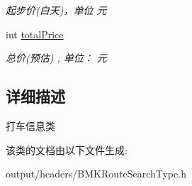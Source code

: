 \begin{DoxyCompactItemize}
\begin{DoxyCompactList}\small\item\em 起步价(白天)，单位 元 \end{DoxyCompactList}\item 
\hypertarget{interface_b_m_k_taxi_info_a4787f76e00a7c1a9cda736bfb9d6bd5e}{}int \hyperlink{interface_b_m_k_taxi_info_a4787f76e00a7c1a9cda736bfb9d6bd5e}{total\+Price}\label{interface_b_m_k_taxi_info_a4787f76e00a7c1a9cda736bfb9d6bd5e}

\begin{DoxyCompactList}\small\item\em 总价(预估) , 单位： 元 \end{DoxyCompactList}\end{DoxyCompactItemize}


\subsection{详细描述}
打车信息类 

该类的文档由以下文件生成\+:\begin{DoxyCompactItemize}
\item 
output/headers/B\+M\+K\+Route\+Search\+Type.\+h\end{DoxyCompactItemize}

